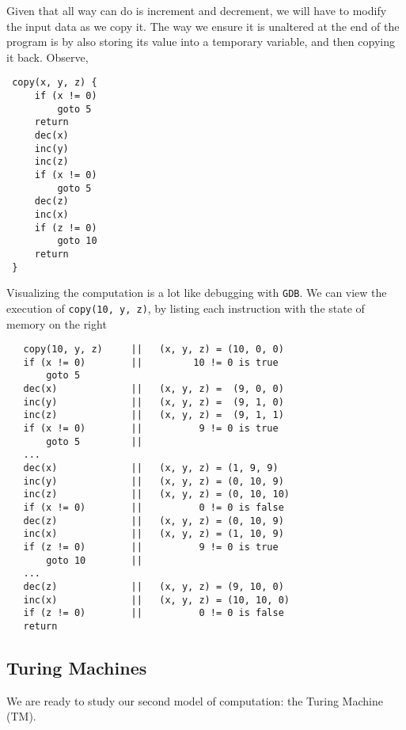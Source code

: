 \documentclass[english, 12pt]{article}
\begin{document}
  
  Given that all way can do is increment and 
  decrement, we will have to modify the input data as we copy it. The way we ensure it is unaltered
  at the end of the program is by also storing its value into a temporary variable, and then
  copying it back. Observe,
  \begin{lstlisting}
 copy(x, y, z) {
     if (x != 0)
         goto 5
     return
     dec(x)
     inc(y)
     inc(z)
     if (x != 0)
         goto 5
     dec(z)
     inc(x)
     if (z != 0)
         goto 10
     return
 }
  \end{lstlisting}
  Visualizing the computation is a lot like debugging with \texttt{GDB}. We can view the execution of
  \texttt{copy(10, y, z)}, by listing each instruction with the state of memory on the right
   \begin{lstlisting}
   copy(10, y, z)     ||   (x, y, z) = (10, 0, 0)
   if (x != 0)        ||         10 != 0 is true
       goto 5
   dec(x)             ||   (x, y, z) =  (9, 0, 0)
   inc(y)             ||   (x, y, z) =  (9, 1, 0)
   inc(z)             ||   (x, y, z) =  (9, 1, 1)
   if (x != 0)        ||          9 != 0 is true 
       goto 5         ||
   ...
   dec(x)             ||   (x, y, z) = (1, 9, 9)
   inc(y)             ||   (x, y, z) = (0, 10, 9)
   inc(z)             ||   (x, y, z) = (0, 10, 10)
   if (x != 0)        ||          0 != 0 is false
   dec(z)             ||   (x, y, z) = (0, 10, 9)
   inc(x)             ||   (x, y, z) = (1, 10, 9)
   if (z != 0)        ||          9 != 0 is true
       goto 10        ||
   ...
   dec(z)             ||   (x, y, z) = (9, 10, 0)
   inc(x)             ||   (x, y, z) = (10, 10, 0)
   if (z != 0)        ||          0 != 0 is false
   return
   \end{lstlisting}
      
  \subsection{Turing Machines} 
  We are ready to study our second model of computation: the Turing Machine (TM). \n
   
\end{document}
